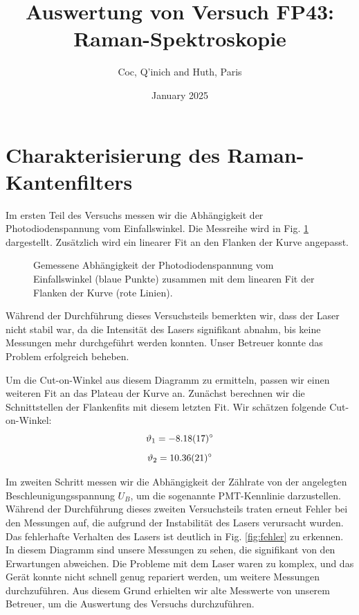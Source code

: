 \documentclass[11pt]{article}
\title{Auswertung von Versuch FP43: Raman-Spektroskopie}
\author{Coc, Q'inich and Huth, Paris}
\date{January 2025}
\begin{document}
\maketitle

\section{Charakterisierung des Raman-Kantenfilters}
Im ersten Teil des Versuchs messen wir die Abhängigkeit der Photodiodenspannung vom Einfallswinkel. Die Messreihe wird in Fig. \ref{fig:justierung} dargestellt. Zusätzlich wird ein linearer Fit an den Flanken der Kurve angepasst.

\begin{figure}[htbp]
	\centering
   \caption{Gemessene Abhängigkeit der Photodiodenspannung vom Einfallswinkel (blaue Punkte) zusammen mit dem linearen Fit der Flanken der Kurve (rote Linien).}
   \label{fig:justierung}
\end{figure}

Während der Durchführung dieses Versuchsteils bemerkten wir, dass der Laser nicht stabil war, da die Intensität des Lasers signifikant abnahm, bis keine Messungen mehr durchgeführt werden konnten. Unser Betreuer konnte das Problem erfolgreich beheben.

Um die Cut-on-Winkel aus diesem Diagramm zu ermitteln, passen wir einen weiteren Fit an das Plateau der Kurve an. Zunächst berechnen wir die Schnittstellen der Flankenfits mit diesem letzten Fit. Wir schätzen folgende Cut-on-Winkel:
$$\vartheta_1 =  \SI{-8.18\pm 0.17}{\degree}$$ 
$$\vartheta_2 =  \SI{10.36\pm 0.21}{\degree}$$ 

Im zweiten Schritt messen wir die Abhängigkeit der Zählrate von der angelegten Beschleunigungsspannung $U_B$, um die sogenannte PMT-Kennlinie darzustellen. Während der Durchführung dieses zweiten Versuchsteils traten erneut Fehler bei den Messungen auf, die aufgrund der Instabilität des Lasers verursacht wurden. Das fehlerhafte Verhalten des Lasers ist deutlich in Fig. \ref{fig:fehler} zu erkennen. In diesem Diagramm sind unsere Messungen zu sehen, die signifikant von den Erwartungen abweichen. Die Probleme mit dem Laser waren zu komplex, und das Gerät konnte nicht schnell genug repariert werden, um weitere Messungen durchzuführen. Aus diesem Grund erhielten wir alte Messwerte von unserem Betreuer, um die Auswertung des Versuchs durchzuführen.
\end{document}
